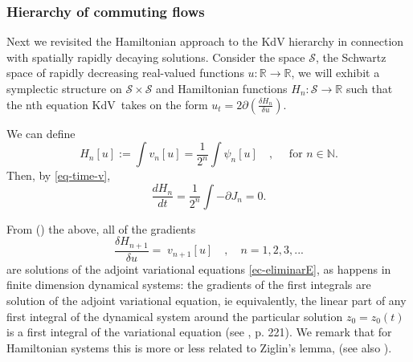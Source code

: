 \documentclass[a4paper,12pt]{article}
\newcommand{\cR}{\mathcal{R}}
\newcommand{\cS}{\mathcal{S}}
\newcommand{\bbN}{\mathbb{N}}
\newcommand{\bbR}{\mathbb{R}}
\def\KdV{\rm KdV}
\def\kdv{\rm kdv}
\def\KdV{\rm KdV}
\begin{document}

\subsubsection{Hierarchy of commuting flows}
Next we revisited the Hamiltonian approach to
the KdV hierarchy in connection with spatially rapidly decaying solutions. Consider 
the  space $\cS $, the Schwartz space of rapidly decreasing real-valued
functions $ u : \bbR\rightarrow\bbR$, we will exhibit a symplectic structure  on $\cS\times\cS$ and
Hamiltonian functions $ H_n : \cS \rightarrow \bbR$ such that the nth equation \KdV \ takes on the
form $u_t =2 \partial (\frac{\delta H_n   }{\delta u })$. 



We can define
\begin{equation}
    H_n [u]:=\int v_{n}[u] =\frac{1}{2^{n}}\int \psi_{n}[u]\quad , \quad \textrm{ for } n\in \bbN .
\end{equation}
Then, by \eqref{eq-time-v},
\[
\frac{dH_n }{dt} =\frac{1}{2^{n} }\int -\partial J_{n} =0 .
\]

From (\cite{GD, olver1993applications}) the above, all of the gradients 
$$
\dfrac{\delta H_{n+1}}{\delta u}= \; 
v_{n+1} [u]\quad , \quad  n=1,2,3,...
$$
are solutions of the adjoint variational equations \eqref{ec-eliminarE}, as happens in finite dimension dynamical systems: the gradients of the first integrals are solution  of the adjoint variational equation, ie equivalently, the linear part of any  first integral of the dynamical system around the particular solution $z_0=z_0(t)$ is a first integral of the variational equation (see \cite{AMV}, p. 221). We remark  that for Hamiltonian systems this is more or less related  to Ziglin's lemma,  \cite{zi1,MR} (see also  \cite{morales}). 
\end{document}
